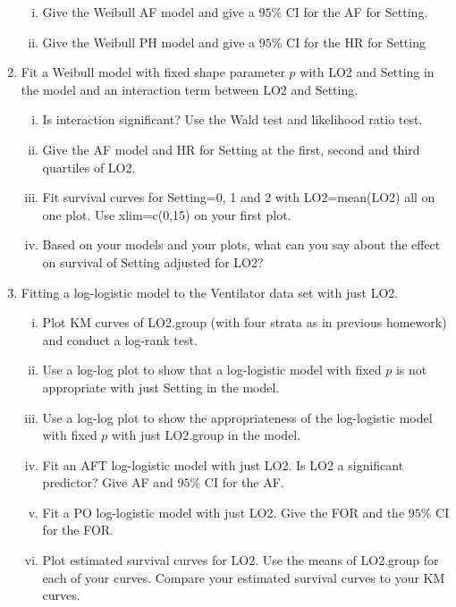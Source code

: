 \documentclass[12pt]{article}
\begin{document}
\begin{enumerate}[1.]
\begin{enumerate}[i.]
\item Give the Weibull AF model and  give a $95\%$ CI for the AF for Setting.   
\item Give the Weibull PH model and give a  $95\%$ CI for the HR for Setting
\end{enumerate}
\item Fit a Weibull model with fixed shape parameter $p$ with LO2 and Setting in the model and an interaction term between LO2 and Setting. 
\begin{enumerate}[i.]
\item Is interaction significant? Use the Wald test and likelihood ratio test. 
\item Give the AF model and HR for Setting at the first, second and third quartiles of LO2. 
\item Fit survival curves for Setting=0, 1 and 2 with LO2=mean(LO2) all on one plot. Use xlim=c(0,15) on your first plot. 
\item Based on your models and your plots, what can you say about the effect on survival of Setting adjusted for LO2?  
\end{enumerate} 
\item Fitting a log-logistic model to the Ventilator data set with just LO2. 
\begin{enumerate}[i.] 

\item Plot KM curves of LO2.group (with four strata as in previous homework) and conduct a log-rank test.
\item Use a log-log plot to show that a log-logistic model with fixed $p$  is not appropriate with just Setting in the model.
\item Use a log-log plot to show the appropriateness of the log-logistic model with fixed $p$ with just LO2.group in the model.
\item Fit an AFT log-logistic model with just LO2. Is LO2 a significant predictor? Give AF and $95\%$ CI for the AF.
\item Fit a PO log-logistic model with just LO2. Give the FOR and the $95\%$ CI for the FOR.
\item Plot estimated survival curves for LO2. Use the means of LO2.group for each of your curves. Compare your estimated survival curves to your KM curves. 
\end{enumerate} 
\end{enumerate} 
\end{document}
